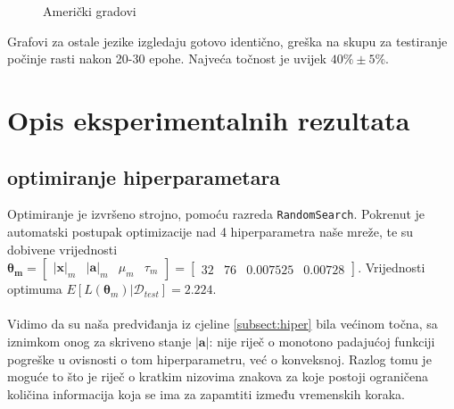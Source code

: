 \documentclass[conference]{IEEEtran}
\begin{document}
\begin{figure}[H]
\centering
{}
\caption{Američki gradovi}
\end{figure}
Grafovi za ostale jezike izgledaju gotovo identično, greška na skupu za testiranje počinje rasti nakon 20-30 epohe. Najveća točnost je uvijek $40\% \pm 5\%$.

\section{Opis eksperimentalnih rezultata} 
\subsection{optimiranje hiperparametara}
Optimiranje je izvršeno strojno, pomoću razreda \texttt{RandomSearch}.
Pokrenut je automatski postupak optimizacije nad 4 hiperparametra naše mreže, te su dobivene vrijednosti $\mathbf{\boldsymbol{\theta}_m} = \begin{bmatrix} \lvert \mathbf{x} \rvert_m & \lvert \mathbf{a} \rvert_m & \mu_m & \tau_m \end{bmatrix} = \begin{bmatrix} 32 & 76 & 0.007525 & 0.00728 \end{bmatrix}$.
Vrijednosti optimuma $E[L(\mathbf{\boldsymbol{\theta}}_m) | \mathcal{D}_{test}] = 2.224$.\\
\\
Vidimo da su naša predviđanja iz cjeline \ref{subsect:hiper} bila većinom točna, sa iznimkom onog za skriveno stanje $\lvert \mathbf{a} \rvert$: nije riječ o monotono padajućoj funkciji pogreške u ovisnosti o tom hiperparametru, već o konveksnoj. Razlog tomu je moguće to što je riječ o kratkim nizovima znakova za koje postoji ograničena količina informacija koja se ima za zapamtiti između vremenskih koraka.
\end{document}
